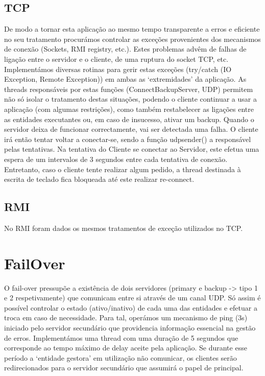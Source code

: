 \documentclass[12pt]{article} %
\begin{document}
\subsection{TCP}
De modo a tornar esta aplicação ao mesmo tempo transparente a erros e eficiente no seu tratamento procurámos controlar as exceções provenientes dos mecanismos de conexão (Sockets, RMI registry, etc.). Estes problemas advêm de falhas de ligação entre o servidor e o cliente, de uma ruptura do socket TCP, etc.
Implementámos diversas rotinas para gerir estas exceções (try/catch (IO Exception, Remote Exception)) em ambas as ‘extremidades’ da aplicação. As threads responsáveis por estas funções (ConnectBackupServer, UDP) permitem não só isolar o tratamento destas situações, podendo o cliente continuar a usar a aplicação (com algumas restrições), como também restabelecer as ligações entre as entidades executantes ou, em caso de insucesso, ativar um backup. 
Quando o servidor deixa de funcionar correctamente, vai ser detectada uma falha. O cliente irá então tentar voltar a conectar-se, sendo a função udpsender() a responsável pelas tentativas.
Na tentativa do Cliente se conectar ao Servidor, este efetua uma espera de um intervalos de 3 segundos entre cada tentativa de conexão. Entretanto, caso o cliente tente realizar algum pedido, a thread destinada à escrita de teclado fica bloqueada até este realizar re-connect.

\subsection{RMI}
No RMI foram dados os mesmos tratamentos de exceção utilizados no TCP.


\pagebreak

\section{FailOver}
\label{sec:failover}
O fail-over pressupõe a existência de dois servidores (primary e backup -> tipo 1 e 2 respetivamente) que comunicam entre si através de um canal UDP. Só assim é possível controlar o estado (ativo/inativo) de cada uma das entidades e efetuar a troca em caso de necessidade. Para tal, operámos um mecanismo de ping (3s) iniciado pelo servidor secundário que providencia informação essencial na gestão de erros. 
Implementámos uma thread com uma duração de 5 segundos que corresponde ao tempo máximo de delay aceite pela aplicação. Se durante esse período a ‘entidade gestora’ em utilização não comunicar, os clientes serão redirecionados para o servidor secundário que assumirá o papel de principal.
\end{document}
